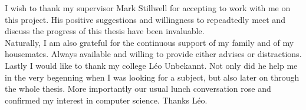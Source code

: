 I wish to thank my supervisor Mark Stillwell for accepting to work with me on this project. His positive suggestions and willingness to repeadtedly meet and discuss the progress of this thesis have been invaluable.\\

Naturally, I am also grateful for the continuous support of my family and of my housemates. Always available and willing to provide either advises or distractions.\\

Lastly I would like to thank my college L\'eo Unbekannt. Not only did he help me in the very begenning when I was looking for a subject, but also later on through the whole thesis. More importantly our usual lunch conversation rose and confirmed my interest in computer science. Thanks L\'eo.

